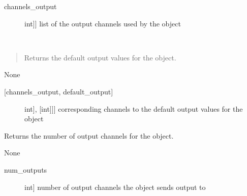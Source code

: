 \documentclass[letterpaper,10pt,english]{sphinxmanual}
\begin{document}
\begin{fulllineitems}
\begin{fulllineitems}
\begin{description}
\item[{channels\_output}] \leavevmode{[}{[}int{]}{]}
\sphinxAtStartPar
list of the output channels used by the object

\end{description}

\end{fulllineitems}


\begin{fulllineitems}
\label{\detokenize{generic:AnalogOutputObject.AnalogOutputObject.get_default_outputs}}~\begin{quote}

\sphinxAtStartPar
Returns the default output values for the object.
\end{quote}

\sphinxAtStartPar
{}

\sphinxAtStartPar
None

\sphinxAtStartPar
{}
\begin{description}
\item[{{[}channels\_output, default\_output{]}}] \leavevmode{[}{[}{[}int{]}, {[}int{]}{]}{]}
\sphinxAtStartPar
corresponding channels to the default output values for the object

\end{description}

\end{fulllineitems}


\begin{fulllineitems}
\label{\detokenize{generic:AnalogOutputObject.AnalogOutputObject.get_num_channels}}
\sphinxAtStartPar
Returns the number of output channels for the object.

\sphinxAtStartPar
{}

\sphinxAtStartPar
None

\sphinxAtStartPar
{}
\begin{description}
\item[{num\_outputs}] \leavevmode{[}int{]}
\sphinxAtStartPar
number of output channels the object sends output to


\end{description}
\end{fulllineitems}
\end{fulllineitems}
\end{document}
